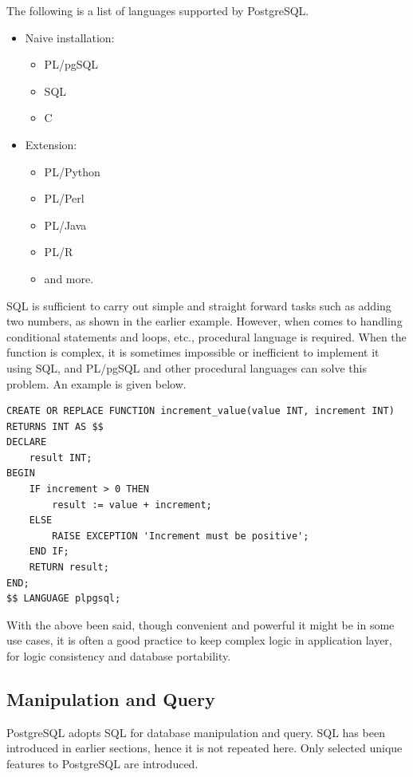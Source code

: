 The following is a list of languages supported by PostgreSQL.
\begin{itemize}
	\item Naive installation:
	\begin{itemize}
		\item PL/pgSQL
		\item SQL
		\item C
	\end{itemize}
	\item Extension:
	\begin{itemize}
		\item PL/Python
		\item PL/Perl
		\item PL/Java
		\item PL/R
		\item and more.
	\end{itemize}
\end{itemize}

SQL is sufficient to carry out simple and straight forward tasks such as adding two numbers, as shown in the earlier example. However, when comes to handling conditional statements and loops, etc., procedural language is required. When the function is complex, it is sometimes impossible or inefficient to implement it using SQL, and PL/pgSQL and other procedural languages can solve this problem. An example is given below.
\begin{lstlisting}
CREATE OR REPLACE FUNCTION increment_value(value INT, increment INT)
RETURNS INT AS $$
DECLARE
	result INT;
BEGIN
	IF increment > 0 THEN
		result := value + increment;
	ELSE
		RAISE EXCEPTION 'Increment must be positive';
	END IF;
	RETURN result;
END;
$$ LANGUAGE plpgsql;
\end{lstlisting}

With the above been said, though convenient and powerful it might be in some use cases, it is often a good practice to keep complex logic in application layer, for logic consistency and database portability.

\subsection{Manipulation and Query}

PostgreSQL adopts SQL for database manipulation and query. SQL has been introduced in earlier sections, hence it is not repeated here. Only selected unique features to PostgreSQL are introduced.

